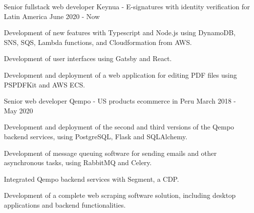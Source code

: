 

\begin{cventries}

  \cventry
    {Senior fullstack web developer} %
    {Keynua {\normalfont - E-signatures with identity verification for Latin America}} %
    {} %
    {June 2020 - Now} %
    {
      \begin{cvitems} %
        \item {Development of new features with Typescript and Node.js using DynamoDB, SNS, SQS, Lambda functions, and Cloudformation from AWS.}
        \item {Development of user interfaces using Gatsby and React.}
        \item {Development and deployment of a web application for editing PDF files using PSPDFKit and AWS ECS.}
      \end{cvitems}
    }

  \cventry
    {Senior web developer} %
    {Qempo {\normalfont - US products ecommerce in Peru}} %
    {} %
    {March 2018 - May 2020} %
    {
      \begin{cvitems} %
        \item {Development and deployment of the second and third versions of the Qempo backend services, using PostgreSQL, Flask and SQLAlchemy.}
        \item {Development of message queuing software for sending emails and other asynchronous tasks, using RabbitMQ and Celery.}
        \item {Integrated Qempo backend services with Segment, a CDP.}
        \item {Development of a complete web scraping software solution, including desktop applications and backend functionalities.}
      \end{cvitems}
    }


\end{cventries}
